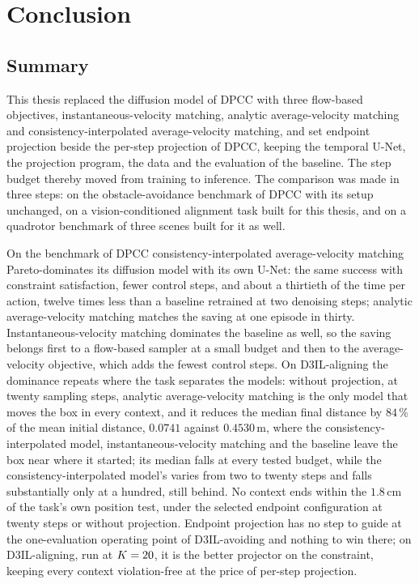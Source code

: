 \chapter{Conclusion}\label{ch:conclusion}

\section{Summary}\label{sec:conc:summary}

This thesis replaced the diffusion model of \ac{DPCC} with three flow-based objectives,
instantaneous-velocity matching, analytic average-velocity matching and consistency-interpolated
average-velocity matching, and set endpoint projection beside the per-step projection of \ac{DPCC},
keeping the temporal U-Net, the projection program, the data and the evaluation of the baseline. The
step budget thereby moved from training to inference. The comparison was made in three steps: on the
obstacle-avoidance benchmark of \ac{DPCC} with its setup unchanged, on a vision-conditioned alignment
task built for this thesis, and on a quadrotor benchmark of three scenes built for it as well.

On the benchmark of \ac{DPCC} consistency-interpolated average-velocity matching Pareto-dominates its
diffusion model with its own U-Net: the same success with constraint satisfaction, fewer control
steps, and about a thirtieth of the time per action, twelve times less than a baseline retrained at
two denoising steps; analytic average-velocity matching matches the saving at one episode in thirty.
Instantaneous-velocity matching dominates the baseline as well, so the saving belongs first to a
flow-based sampler at a small budget and then to the average-velocity objective, which adds the fewest
control steps. On D3IL-aligning the dominance repeats where the task separates the models: without projection, at
twenty sampling steps, analytic average-velocity matching is the only model that moves the box in
every context, and it reduces the median final distance by $84\,\%$ of the mean initial distance,
$0.0741$ against $0.4530$\,m, where the consistency-interpolated model, instantaneous-velocity
matching and the baseline leave the box near where it started; its median falls at every tested
budget, while the consistency-interpolated model's varies from two to twenty steps and falls
substantially only at a hundred, still behind. No context ends within the $1.8$\,cm of the task's own
position test, under the selected endpoint configuration at twenty steps or without projection.
Endpoint projection has no step to guide at the one-evaluation operating point of D3IL-avoiding and
nothing to win there; on D3IL-aligning, run at $K = 20$, it is the better projector on the
constraint, keeping every context violation-free at the price of per-step projection.

